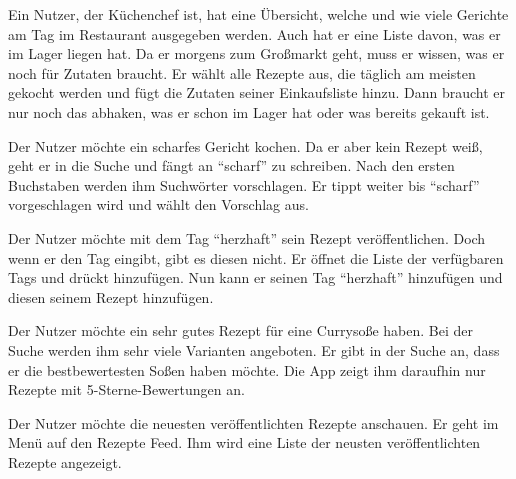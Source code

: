  Ein Nutzer, der Küchenchef ist, hat eine Übersicht, welche und wie viele Gerichte am Tag im Restaurant ausgegeben werden. Auch hat er eine Liste davon, was er im Lager liegen hat.	Da er morgens zum Großmarkt geht, muss er wissen, was er noch für Zutaten braucht. Er wählt alle Rezepte aus, die täglich am meisten gekocht werden und fügt die Zutaten seiner Einkaufsliste hinzu. Dann braucht er nur noch das abhaken, was er schon im Lager hat oder was bereits gekauft ist.
		
Der Nutzer möchte ein scharfes Gericht kochen. Da er aber kein Rezept weiß, geht er in die Suche und fängt an "`scharf"' zu schreiben. Nach den ersten Buchstaben werden ihm Suchwörter vorschlagen. Er tippt weiter bis "`scharf"' vorgeschlagen wird und wählt den Vorschlag aus.

Der Nutzer möchte mit dem Tag "`herzhaft"' sein Rezept veröffentlichen. Doch wenn er den Tag eingibt, gibt es diesen nicht. Er öffnet die Liste der verfügbaren Tags und drückt hinzufügen. Nun kann er seinen Tag "`herzhaft"' hinzufügen und diesen seinem Rezept hinzufügen.
		
Der Nutzer möchte ein sehr gutes Rezept für eine Currysoße haben. Bei der Suche werden ihm sehr viele Varianten angeboten. Er gibt in der Suche an, dass er die bestbewertesten Soßen haben möchte. Die App zeigt ihm daraufhin nur Rezepte mit 5-Sterne-Bewertungen an. 

Der Nutzer möchte die neuesten veröffentlichten Rezepte anschauen. Er geht im Menü auf den Rezepte Feed. Ihm wird eine Liste der neusten veröffentlichten Rezepte angezeigt.
